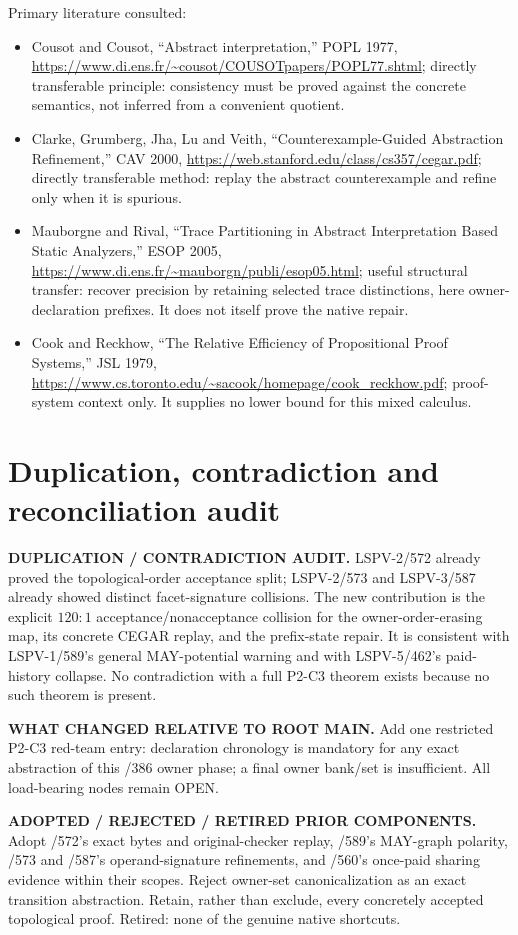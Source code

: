 \documentclass[11pt]{article}
\begin{document}
Primary literature consulted:
\begin{itemize}
\item Cousot and Cousot, ``Abstract interpretation,'' POPL 1977, \url{https://www.di.ens.fr/~cousot/COUSOTpapers/POPL77.shtml}; directly transferable principle: consistency must be proved against the concrete semantics, not inferred from a convenient quotient.
\item Clarke, Grumberg, Jha, Lu and Veith, ``Counterexample-Guided Abstraction Refinement,'' CAV 2000, \url{https://web.stanford.edu/class/cs357/cegar.pdf}; directly transferable method: replay the abstract counterexample and refine only when it is spurious.
\item Mauborgne and Rival, ``Trace Partitioning in Abstract Interpretation Based Static Analyzers,'' ESOP 2005, \url{https://www.di.ens.fr/~mauborgn/publi/esop05.html}; useful structural transfer: recover precision by retaining selected trace distinctions, here owner-declaration prefixes.  It does not itself prove the native repair.
\item Cook and Reckhow, ``The Relative Efficiency of Propositional Proof Systems,'' JSL 1979, \url{https://www.cs.toronto.edu/~sacook/homepage/cook_reckhow.pdf}; proof-system context only.  It supplies no lower bound for this mixed calculus.
\end{itemize}

\section{Duplication, contradiction and reconciliation audit}
\textbf{DUPLICATION / CONTRADICTION AUDIT.} LSPV-2/572 already proved the topological-order acceptance split; LSPV-2/573 and LSPV-3/587 already showed distinct facet-signature collisions.  The new contribution is the explicit \(120\!:\!1\) acceptance/nonacceptance collision for the owner-order-erasing map, its concrete CEGAR replay, and the prefix-state repair.  It is consistent with LSPV-1/589's general MAY-potential warning and with LSPV-5/462's paid-history collapse.  No contradiction with a full P2-C3 theorem exists because no such theorem is present.

\textbf{WHAT CHANGED RELATIVE TO ROOT MAIN.} Add one restricted P2-C3 red-team entry: declaration chronology is mandatory for any exact abstraction of this /386 owner phase; a final owner bank/set is insufficient.  All load-bearing nodes remain OPEN.

\textbf{ADOPTED / REJECTED / RETIRED PRIOR COMPONENTS.} Adopt /572's exact bytes and original-checker replay, /589's MAY-graph polarity, /573 and /587's operand-signature refinements, and /560's once-paid sharing evidence within their scopes.  Reject owner-set canonicalization as an exact transition abstraction.  Retain, rather than exclude, every concretely accepted topological proof.  Retired: none of the genuine native shortcuts.
\end{document}

